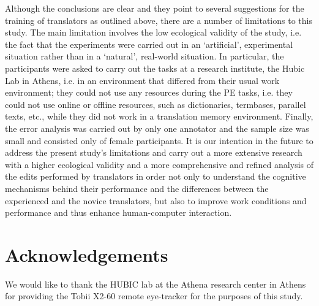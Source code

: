 \documentclass[output=paper]{langscibook}
\begin{document}
Although the conclusions are clear and they point to several suggestions for the training of translators as outlined above, there are a number of limitations to this study. The main limitation involves the low ecological validity of the study, i.e. the fact that the experiments were carried out in an ‘artificial’, experimental situation rather than in a ‘natural’, real-world situation. In particular, the participants were asked to carry out the tasks at a research institute, the Hubic Lab in Athens, i.e. in an environment that differed from their usual work environment; they could not use any resources during the PE tasks, i.e. they could not use online or offline resources, such as dictionaries, termbases, parallel texts, etc., while they did not work in a translation memory environment. Finally, the error analysis was carried out by only one annotator and the sample size was small and consisted only of female participants. It is our intention in the future to address the present study’s limitations and carry out a more extensive research with a higher ecological validity and a more comprehensive and refined analysis of the edits performed by translators in order not only to understand the cognitive mechanisms behind their performance and the differences between the experienced and the novice translators, but also to improve work conditions and performance and thus enhance human-computer interaction. 

\section*{Acknowledgements}
We would like to thank the HUBIC lab at the Athena research center in Athens for providing the Tobii X2-60 remote eye-tracker for the purposes of this study.
{\sloppy\printbibliography[heading=subbibliography,notkeyword=this]}
\end{document}
